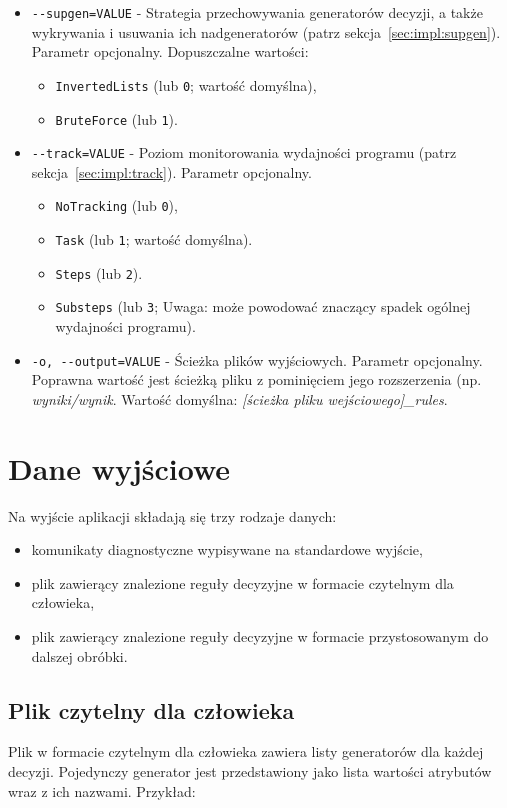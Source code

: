 \documentclass[a4paper,10pt]{article}
\begin{document}
\begin{itemize}
  \item \verb+--supgen=VALUE+ - Strategia przechowywania generatorów decyzji, a także wykrywania i usuwania ich nadgeneratorów (patrz sekcja~\ref{sec:impl:supgen}). Parametr opcjonalny.
  Dopuszczalne wartości:
  \begin{itemize}
   \item \verb+InvertedLists+ (lub \verb+0+; wartość domyślna),
   \item \verb+BruteForce+ (lub \verb+1+).
  \end{itemize}
  
  \item \verb+--track=VALUE+ - Poziom monitorowania wydajności programu (patrz sekcja~\ref{sec:impl:track}). Parametr opcjonalny.
  \begin{itemize}
   \item \verb+NoTracking+ (lub \verb+0+),
   \item \verb+Task+ (lub \verb+1+; wartość domyślna).
   \item \verb+Steps+ (lub \verb+2+).
   \item \verb+Substeps+ (lub \verb+3+; Uwaga: może powodować znaczący spadek ogólnej wydajności programu).
  \end{itemize}
  
  \item \verb+-o, --output=VALUE+ - Ścieżka plików wyjściowych. Parametr opcjonalny. Poprawna wartość jest ścieżką pliku z pominięciem jego rozszerzenia (np. \emph{wyniki/wynik}. Wartość domyślna: \emph{[ścieżka pliku wejściowego]\_rules}.
 \end{itemize}



\section{Dane wyjściowe} \label{sec:output}
Na wyjście aplikacji składają się trzy rodzaje danych:

\begin{itemize}
 \item komunikaty diagnostyczne wypisywane na standardowe wyjście,
 \item plik zawierący znalezione reguły decyzyjne w formacie czytelnym dla człowieka,
 \item plik zawierący znalezione reguły decyzyjne w formacie przystosowanym do dalszej obróbki.
\end{itemize}

 \subsection{Plik czytelny dla człowieka} \label{sec:output:human}
 Plik w formacie czytelnym dla człowieka zawiera listy generatorów dla każdej decyzji.
 Pojedynczy generator jest przedstawiony jako lista wartości atrybutów wraz z ich nazwami.
 Przykład:
 
\end{document}
